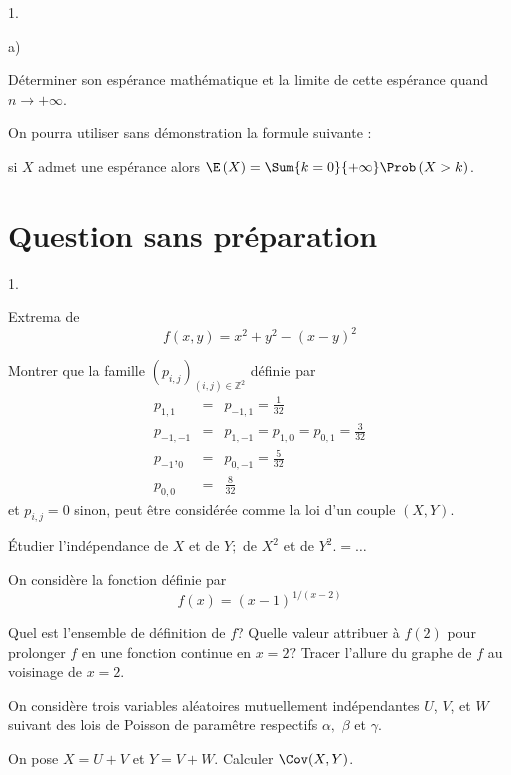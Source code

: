 \documentclass[11pt]{article}%
\begin{document}
\begin{noliste}{1.}
\begin{noliste}{a)}
  \item Déterminer son espérance mathématique et la limite de cette
    espérance quand $n\rightarrow +\infty$.

    On pourra utiliser sans démonstration la formule suivante :

    si $X$ admet une espérance alors $\E\left( X\right) =
    \Sum{k=0}{+\infty } \Prob\left( X>k\right)$.
  \end{noliste}
\end{noliste}

\section*{\textbf{Question sans préparation}}

\begin{noliste}{1.}
\item Extrema de 
  \[
  f\left( x,y\right) =x^{2}+y^{2}-\left( x-y\right) ^{2} 
  \]

\item Montrer que la famille $\left( p_{i,j}\right) _{\left(
      i,j\right) \in \mathbb{Z}^{2}}$ définie par
  \begin{eqnarray*}
    p_{1,1} & = & p_{-1,1}=\frac{1}{32} \\
    p_{-1,-1} & = & p_{1,-1}=p_{1,0}=p_{0,1}=\frac{3}{32} \\
    p_{-1},_{0} & = & p_{0,-1}=\frac{5}{32} \\
    p_{0,0} & = & \frac{8}{32}
  \end{eqnarray*}%
  et $p_{i,j}=0$ sinon, peut être considérée comme la loi d'un couple
  $\left( X,Y\right)$.

  Étudier l'indépendance de $X$ et de $Y;$ de $X^{2}$ et de $Y^{2}. =
  \dots $

\item On considère la fonction définie par 
  \[
  f\left( x\right) =\left( x-1\right) ^{1/\left( x-2\right) } 
  \]

  Quel est l'ensemble de définition de $f$? Quelle valeur attribuer à
  $f\left( 2\right) $ pour prolonger $f$ en une fonction continue en
  $x=2?$ Tracer l'allure du graphe de $f$ au voisinage de $x=2$.

\item On considère trois variables aléatoires mutuellement
  indépendantes $U$, $V$, et $W$ suivant des lois de Poisson de
  paramêtre respectifs $\alpha ,$ $\beta $ et $\gamma$.

  On pose $X=U+V$ et $Y=V+W$. Calculer $\Cov(X, Y)$.


\end{noliste}
\end{document}
